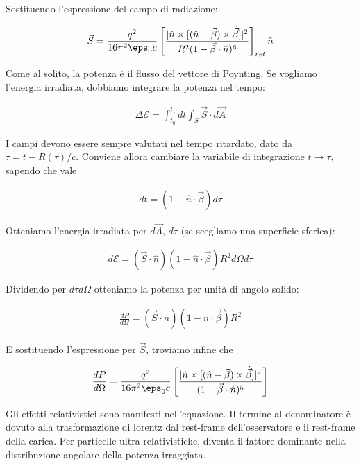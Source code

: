 \documentclass{report}
\begin{document}
Sostituendo l'espressione del campo di radiazione:

\begin{align}
    \vec{S} = \frac{q^2}{16\pi^2 \eps_0 c}\left[\frac{|\hat{n}\times [(\hat{n}-\vec{\beta})\times \dot{\vec{\beta}}]|^2}{R^2(1-\vec{\beta}\cdot \hat{n})^6}\right]_{ret}\hat{n}
\end{align}

Come al solito, la potenza è il flusso del vettore di Poynting. Se vogliamo l'energia irradiata, dobbiamo integrare la potenza nel tempo: 

\begin{align}
    \Delta \mathcal{E} = \int_{t_0}^{t_1} dt \int_S \vec{S}\cdot d\vec{A}
\end{align}

I campi devono essere sempre valutati nel tempo ritardato, dato da \(\tau = t - R(\tau)/c\). Conviene allora cambiare la variabile di integrazione \(t \rightarrow \tau\), sapendo che vale 

\begin{align}
    dt = (1-\hat{n}\cdot \vec{\beta})d\tau 
\end{align}

Otteniamo l'energia irradiata per \(d\vec{A}, \, d\tau\) (se scegliamo una superficie sferica): 

\begin{align}
    d\mathcal{E} = (\vec{S}\cdot \hat{n}) (1-\hat{n}\cdot \vec{\beta})R^2d\Omega d\tau
\end{align}

Dividendo per \(d\tau d\Omega\) otteniamo la potenza per unità di angolo solido: 

\begin{align}
    \frac{dP}{d\Omega} = (\vec{S}\cdot \hat{n})(1-\hat{n}\cdot\vec{\beta}) R^2
\end{align}

E sostituendo l'espressione per \(\vec{S}\), troviamo infine che 

\begin{align}
    \frac{dP}{d\Omega} = \frac{q^2}{16\pi^2 \eps_0 c}\left[\frac{|\hat{n}\times [(\hat{n}-\vec{\beta})\times \dot{\vec{\beta}}]|^2}{(1-\vec{\beta}\cdot \hat{n})^5}\right]
\end{align}

Gli effetti relativistici sono manifesti nell'equazione. Il termine al denominatore è dovuto alla trasformazione di lorentz dal rest-frame dell'osservatore e il rest-frame della carica. Per particelle ultra-relativistiche, diventa il fattore dominante nella distribuzione angolare della potenza irraggiata. \\
\end{document}
